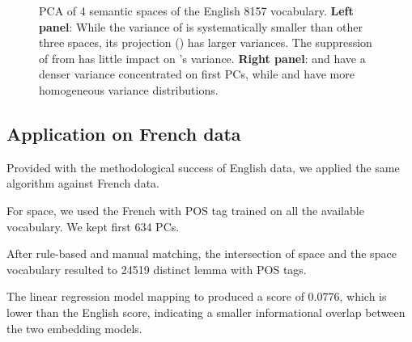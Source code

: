 \begin{figure}
    \centering
    \caption[EVR of 4 Semantic Spaces, English]{PCA of 4 semantic spaces of the English 8157 vocabulary. \textbf{Left panel}: While the variance of  is systematically smaller than other three spaces, its projection () has larger variances. The suppression of  from  has little impact on 's variance. \textbf{Right panel}:  and  have a denser variance concentrated on first PCs, while  and  have more homogeneous variance distributions.} 
    \label{fig:EngDecorVarRatio}
\end{figure}



\subsection{Application on French data}

Provided with the methodological success of English data, we applied the same algorithm against French data.

For  space, we used the French  with POS tag trained on all the available vocabulary. We kept first 634 PCs.

After rule-based and manual matching, the intersection of  space and the  space vocabulary resulted to 24519 distinct lemma with POS tags.

The linear regression model mapping  to  produced a  score of 0.0776, which is lower than the English score, indicating a smaller informational overlap between the two embedding models.

